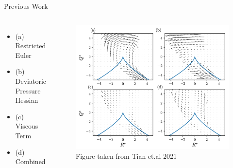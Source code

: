 \begin{frame}{Previous Work}
  \begin{columns}
    \begin{itemize}
    \item (a) Restricted Euler
    \item (b) Deviatoric Pressure Hessian
    \item (c) Viscous Term
    \item (d) Combined
    \end{itemize}

    \begin{figure}
      \includegraphics[width=\textwidth]{tian_qr_cmt.png}
      \caption{Figure taken from Tian et.al 2021}
    \end{figure}

  \end{columns}
\end{frame}

